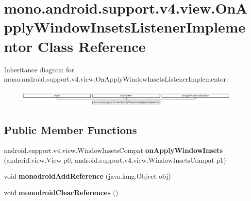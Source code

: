 \hypertarget{classmono_1_1android_1_1support_1_1v4_1_1view_1_1_on_apply_window_insets_listener_implementor}{}\section{mono.\+android.\+support.\+v4.\+view.\+On\+Apply\+Window\+Insets\+Listener\+Implementor Class Reference}
\label{classmono_1_1android_1_1support_1_1v4_1_1view_1_1_on_apply_window_insets_listener_implementor}
Inheritance diagram for mono.\+android.\+support.\+v4.\+view.\+On\+Apply\+Window\+Insets\+Listener\+Implementor\+:\begin{figure}[H]
\begin{center}
\leavevmode
\includegraphics[height=0.862202cm]{classmono_1_1android_1_1support_1_1v4_1_1view_1_1_on_apply_window_insets_listener_implementor}
\end{center}
\end{figure}
\subsection*{Public Member Functions}
\begin{DoxyCompactItemize}
\item 
\mbox{\label{classmono_1_1android_1_1support_1_1v4_1_1view_1_1_on_apply_window_insets_listener_implementor_a2230411e95dcf2d47b86e1b35d2e91ee}} 
android.\+support.\+v4.\+view.\+Window\+Insets\+Compat {\bfseries on\+Apply\+Window\+Insets} (android.\+view.\+View p0, android.\+support.\+v4.\+view.\+Window\+Insets\+Compat p1)
\item 
\mbox{\label{classmono_1_1android_1_1support_1_1v4_1_1view_1_1_on_apply_window_insets_listener_implementor_a1cc958285db59d60fb6eac2b1f8295ec}} 
void {\bfseries monodroid\+Add\+Reference} (java.\+lang.\+Object obj)
\item 
\mbox{\label{classmono_1_1android_1_1support_1_1v4_1_1view_1_1_on_apply_window_insets_listener_implementor_ac798280f8de141aa346f20a7cee58899}} 
void {\bfseries monodroid\+Clear\+References} ()
\end{DoxyCompactItemize}

